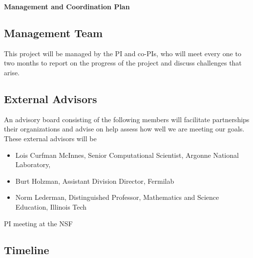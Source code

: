 \documentclass[11pt]{NSFamsart}
\begin{document}
\setlength{\leftmargini}{2.5ex}

\centerline{\textbf{\Large Management and Coordination Plan}}

\bigskip

\subsection*{Management Team} This project will be managed by the PI and co-PIs, who will meet every one to two months to report on the progress of the project and discuss challenges that arise.

\subsection*{External Advisors}  An advisory board consisting of the following members will facilitate partnerships their organizations and advise on help assess how well we are meeting our goals.  These external advisors will be
\begin{itemize}
\item Lois Curfman McInnes, Senior Computational Scientist, Argonne National Laboratory,
\item Burt Holzman, Assistant Division Director, Fermilab
\item Norm Lederman, Distinguished Professor, Mathematics and Science Education, Illinois Tech

\end{itemize}

PI meeting at the NSF

\subsection*{Timeline}
\end{document}
